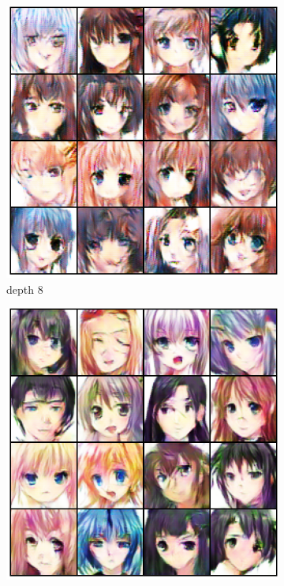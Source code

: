\begin{figure}[H]
    \centering
    \begin{subfigure}[b]{0.24\textwidth}
        \centering
        \includegraphics[width=\textwidth]{resources/images/output_anime_8.eps}
        \caption{depth 8}
        \label{fig:anime_8}
    \end{subfigure}
    \hfill
    \begin{subfigure}[b]{0.24\textwidth}
        \centering
        \includegraphics[width=\textwidth]{resources/images/output_anime_16.eps}

\end{subfigure}
\end{figure}
